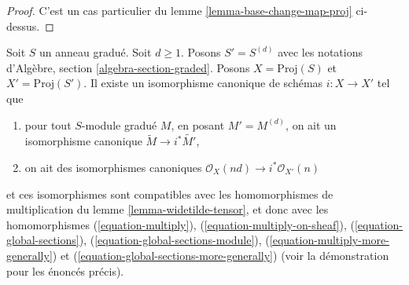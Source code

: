 \begin{proof}
C'est un cas particulier du lemme \ref{lemma-base-change-map-proj} ci-dessus.
\end{proof}

\begin{lemma}
\label{lemma-d-uple}
Soit $S$ un anneau gradué. Soit $d \geq 1$. Posons $S' = S^{(d)}$ avec les notations
d'Algèbre, section \ref{algebra-section-graded}. Posons
$X = \text{Proj}(S)$ et $X' = \text{Proj}(S')$. Il existe un
isomorphisme canonique de schémas $i : X \to X'$ tel que
\begin{enumerate}
\item pour tout $S$-module gradué $M$, en posant $M' = M^{(d)}$,
on ait un isomorphisme canonique $\widetilde{M} \to i^*\widetilde{M'}$,
\item on ait des isomorphismes canoniques
$\mathcal{O}_{X}(nd) \to i^*\mathcal{O}_{X'}(n)$
\end{enumerate}
et ces isomorphismes sont compatibles avec les homomorphismes de multiplication
du lemme \ref{lemma-widetilde-tensor}, et donc avec les homomorphismes
(\ref{equation-multiply}),
(\ref{equation-multiply-on-sheaf}),
(\ref{equation-global-sections}),
(\ref{equation-global-sections-module}),
(\ref{equation-multiply-more-generally}) et
(\ref{equation-global-sections-more-generally}) (voir la démonstration pour les
énoncés précis).
\end{lemma}


